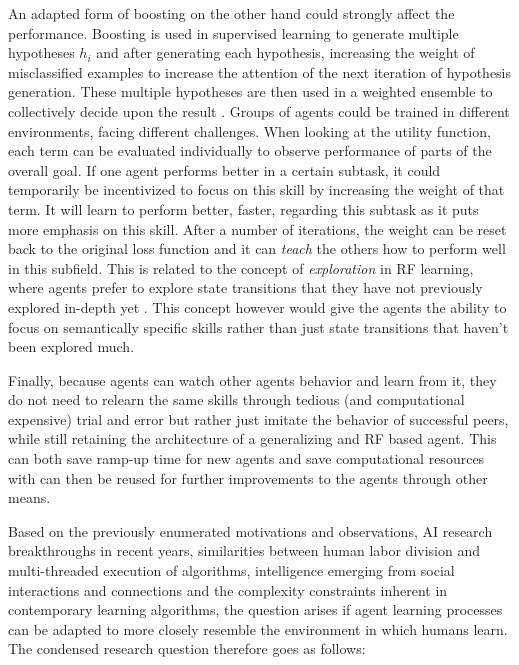 \documentclass[12pt,a4paper]{article}
\begin{document}
An adapted form of boosting on the other hand could strongly affect the performance. Boosting is used in supervised learning to generate multiple hypotheses $h_i$ and after generating each hypothesis, increasing the weight of misclassified examples to increase the attention of the next iteration of hypothesis generation. These multiple hypotheses are then used in a weighted ensemble to collectively decide upon the result \cite[p.749 ff.]{russell2016artificial}. Groups of agents could be trained in different environments, facing different challenges. When looking at the utility function, each term can be evaluated individually to observe performance of parts of the overall goal. If one agent performs better in a certain subtask, it could temporarily be incentivized to focus on this skill by increasing the weight of that term. It will learn to perform better, faster, regarding this subtask as it puts more emphasis on this skill. After a number of iterations, the weight can be reset back to the original loss function and it can \emph{teach} the others how to perform well in this subfield. This is related to the concept of \emph{exploration} in RF learning, where agents prefer to explore state transitions that they have not previously explored in-depth yet \cite[p.839f.]{russell2016artificial}. This concept however would give the agents the ability to focus on semantically specific skills rather than just state transitions that haven't been explored much.

Finally, because agents can watch other agents behavior and learn from it, they do not need to relearn the same skills through tedious (and computational expensive) trial and error but rather just imitate the behavior of successful peers, while still retaining the architecture of a generalizing and \ac{RF} based agent. This can both save ramp-up time for new agents and save computational resources with can then be reused for further improvements to the agents through other means.

Based on the previously enumerated motivations and observations, AI research breakthroughs in recent years, similarities between human labor division and multi-threaded execution of algorithms, intelligence emerging from social interactions and connections and the complexity constraints inherent in contemporary learning algorithms, the question arises if agent learning processes can be adapted to more closely resemble the environment in which humans learn. The condensed research question therefore goes as follows:
\end{document}
